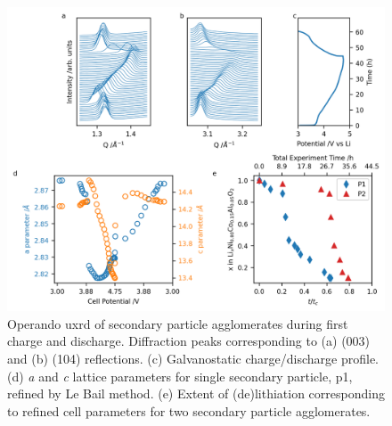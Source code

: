 \documentclass{WileyMSP-template}
\begin{document}
\begin{figure}[!h]
  \includegraphics[width=\textwidth]{figures/NCA_xrd.png}
  \caption{Operando \gls{uxrd} of \nca{} secondary particle
    agglomerates during first charge and discharge. Diffraction peaks
    corresponding to (a) (003) and (b) (104) reflections. (c)
    Galvanostatic charge/discharge profile. (d) \textit{a} and
    \textit{c} lattice parameters for single secondary particle,
    \gls{p1}, refined by Le Bail method. (e) Extent of (de)lithiation
    corresponding to refined cell parameters\cite{robert2015} for two
    secondary particle agglomerates.}
  \label{fig:uxrd}
\end{figure}
\end{document}
